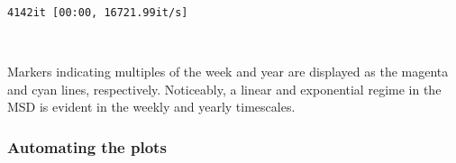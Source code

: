 \documentclass[11pt]{article}
\begin{document}
    \begin{Verbatim}[commandchars=\\\{\}]
4142it [00:00, 16721.99it/s]
    \end{Verbatim}

    \begin{center}
    \end{center}
    { \hspace*{\fill} \\}
    
    Markers indicating multiples of the week and year are displayed as the
magenta and cyan lines, respectively. Noticeably, a linear and
exponential regime in the MSD is evident in the weekly and yearly
timescales.

    \subsubsection{Automating the plots}\label{automating-the-plots}
\end{document}
